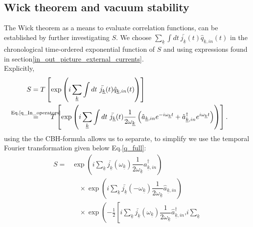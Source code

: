 \documentclass[12pt, titlepage]{article}
\begin{document}
\begin{subappendices}
\subsection{Wick theorem and vacuum stability}\label{Vacuum_transition}
The Wick theorem as a means to evaluate correlation functions, can be established by further investigating $ S $. We choose $ \sum_{\underline{k}}\int dt \ \bar{j_{\underline{k}}}(t) \hat{q}_{\underline{k},in}(t) $ in the chronological time-ordered exponential function of $ S $ and using expressions found in section\enskip\ref{in_out_picture_external_currents}.\\
Explicitly,
\begin{subequations}
\begin{align}
	S &=
	T\left[
    \exp
    \left(
    i
    \sum_{\underline{k}}\int dt \ \bar{j_{\underline{k}}}(t) \hat{q}_{\underline{k},in}(t) 
    \right)
    \right]  
   \\
   &\stackrel{\mathclap{\text{Eq.\text{\eqref{q_In_operators}}}}}{=} \hspace*{1.5em} 
   T\left[
   \exp
   \left(
       i
    \sum_{\underline{k}}\int dt \ \bar{j_{\underline{k}}}(t)
     \dfrac{1}{2\omega_{\underline{k}}}\left(
	\hat{a}_{\underline{k},in} 
	e^{-i\omega_{\underline{k}}t}
	+
	\hat{a}^{\dagger}_{\underline{k},in}  
	e^{i\omega_{\underline{k}}t}
  \right)
   \right)
   \right]   
   .
\end{align}
\end{subequations}
using the the CBH-formula allows us to separate, to simplify we use the temporal Fourier transformation given below Eq.\enskip\eqref{q_full}:
\begin{equation}
\begin{split}
S=
&
 \exp
    \left(
       i
    \sum_{\underline{k}}
    \bar{j_{\underline{k}}}(\omega_{\underline{k}})
     	\dfrac{1}{2\omega_{\underline{k}}}
			\hat{a}^{\dagger}_{\underline{k},in}    
    \right)
	\\
&\quad
 \times
    \exp
    \left(
        i
    \sum_{\underline{k}}
    \bar{j_{\underline{k}}}(-\omega_{\underline{k}})
     	\dfrac{1}{2\omega_{\underline{k}}}
			\hat{a}_{\underline{k},in} 
    \right)    
	\\
&\quad
   \times 
   \exp
    \left(
       -\frac{1}{2}
            	\left[
            	     			i
     	    \sum_{\underline{k}}
     	        \bar{j_{\underline{k}}}(\omega_{\underline{k}})
     	\dfrac{1}{2\omega_{\underline{k}}}
			\hat{a}^{\dagger}_{\underline{k},in} 
     	\textbf{,}
            	i
    \sum_{\underline{k}}

\end{split}
\end{equation}
\end{subappendices}
\end{document}
